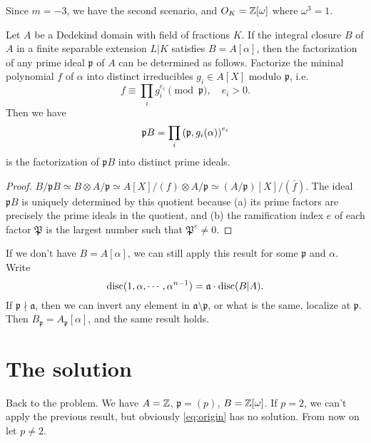 \documentclass{article}
\begin{document}
Since $m=-3$, we have the second scenario, and $O_K=\mathbb{Z}[\omega]$ where $\omega^3=1$.

\begin{theorem}
    Let $A$ be a Dedekind domain with field of fractions $K$. If the integral closure $B$ of $A$ in a finite separable extension $L\vert K$ satisfies $B=A[\alpha]$, then the factorization of any prime ideal $\mathfrak{p}$ of $A$ can be determined as follows. Factorize the mininal polynomial $f$ of $\alpha$ into distinct irreducibles $g_{i}\in A[X]$ modulo $\mathfrak{p}$, i.e.
    \[
        f \equiv \prod_{i}g_{i}^{e_{i}} \pmod{\mathfrak{p}}, \quad e_{i}>0.
    \]
    Then we have
    \[
        \mathfrak{p}B = \prod_{i} \left(\mathfrak{p},g_{i}(\alpha)\right)^{e_{i}}
    \]
    is the factorization of $\mathfrak{p}B$ into distinct prime ideals.
\end{theorem}

\begin{proof}
    $B/\mathfrak{p}B \simeq B\otimes A/\mathfrak{p} \simeq A[X]/(f)\otimes A/\mathfrak{p} \simeq (A/\mathfrak{p})[X]/(\bar{f})$. The ideal $\mathfrak{p}B$ is uniquely determined by this quotient because (a) its prime factors are precisely the prime ideals in the quotient, and (b) the ramification index $e$ of each factor $\mathfrak{P}$ is the largest number such that $\mathfrak{P}^e\neq 0$.  
\end{proof}

If we don't have $B=A[\alpha]$, we can still apply this result for some $\mathfrak{p}$ and $\alpha$. Write 
\[\operatorname{disc}(1,\alpha,\cdots,\alpha^{n-1})=\mathfrak{a}\cdot\operatorname{disc}(B\vert A).\]
If $\mathfrak{p}\nmid\mathfrak{a}$, then we can invert any element in $\mathfrak{a}\setminus\mathfrak{p}$, or what is the same, localize at $\mathfrak{p}$. Then $B_{\mathfrak{p}}=A_{\mathfrak{p}}[\alpha]$, and the same result holds.

\section{The solution}

Back to the problem. We have $A=\mathbb{Z}$, $\mathfrak{p}=(p)$, $B=\mathbb{Z}[\omega]$. If $p=2$, we can't apply the previous result, but obviously \eqref{eq:origin} has no solution. From now on let $p\neq 2$.
\end{document}

